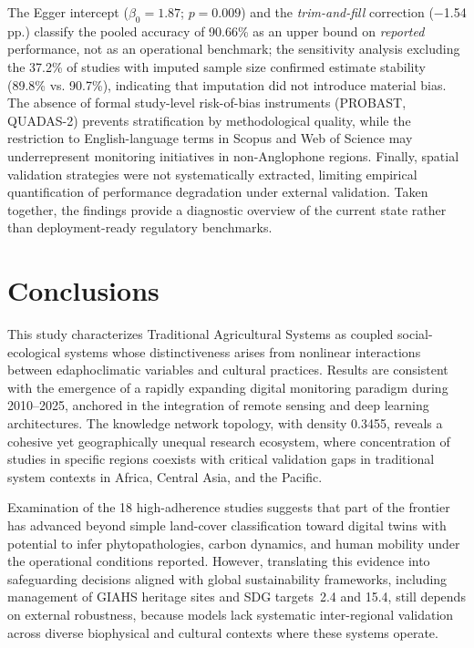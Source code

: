 \documentclass[lineno,pdflatex,sn-apa]{sn-jnl}
\begin{document}
The Egger intercept ($\beta_0 = 1.87$; $p = 0.009$) and the \textit{trim-and-fill} correction ($-$1.54 pp.) classify the pooled accuracy of 90.66\% as an upper bound on \textit{reported} performance, not as an operational benchmark; the sensitivity analysis excluding the 37.2\% of studies with imputed sample size confirmed estimate stability (89.8\% vs. 90.7\%), indicating that imputation did not introduce material bias. The absence of formal study-level risk-of-bias instruments (PROBAST, QUADAS-2) prevents stratification by methodological quality, while the restriction to English-language terms in Scopus and Web of Science may underrepresent monitoring initiatives in non-Anglophone regions. Finally, spatial validation strategies were not systematically extracted, limiting empirical quantification of performance degradation under external validation. Taken together, the findings provide a diagnostic overview of the current state rather than deployment-ready regulatory benchmarks.

\section{Conclusions}

This study characterizes Traditional Agricultural Systems as coupled social-ecological systems whose distinctiveness arises from nonlinear interactions between edaphoclimatic variables and cultural practices. Results are consistent with the emergence of a rapidly expanding digital monitoring paradigm during 2010--2025, anchored in the integration of remote sensing and deep learning architectures. The knowledge network topology, with density 0.3455, reveals a cohesive yet geographically unequal research ecosystem, where concentration of studies in specific regions coexists with critical validation gaps in traditional system contexts in Africa, Central Asia, and the Pacific.

Examination of the 18 high-adherence studies suggests that part of the frontier has advanced beyond simple land-cover classification toward digital twins with potential to infer phytopathologies, carbon dynamics, and human mobility under the operational conditions reported. However, translating this evidence into safeguarding decisions aligned with global sustainability frameworks, including management of GIAHS heritage sites and SDG targets~2.4 and 15.4, still depends on external robustness, because models lack systematic inter-regional validation across diverse biophysical and cultural contexts where these systems operate.
\end{document}

